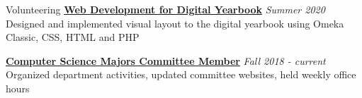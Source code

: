 \documentclass{resume}
\begin{document}

\begin{rSection}{Volunteering}
{\bf \href{https://www.oc2020.oberlincollegelibrary.org/}{Web Development for Digital Yearbook}} \hfill{\em Summer 2020} \\
Designed and implemented visual layout to the digital yearbook using Omeka Classic, CSS, HTML and PHP

\href{http://www.cs.oberlin.edu/~csmc/officers.php}{\textbf{Computer Science Majors Committee Member}} \hfill {\em Fall 2018 - current} \\
Organized department activities, updated committee websites, held weekly office hours

\end{rSection}
\end{document}
